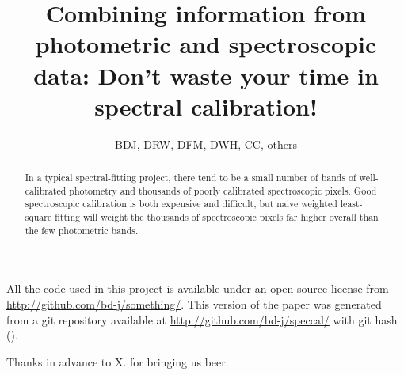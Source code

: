 \documentclass[12pt, preprint]{aastex}
\begin{document}
\title{Combining information from photometric and spectroscopic data:
  Don't waste your time in spectral calibration!}
\author{BDJ, DRW, DFM, DWH, CC, others}

\begin{abstract}
In a typical spectral-fitting project,
  there tend to be a small number of bands of well-calibrated photometry
  and thousands of poorly calibrated spectroscopic pixels.
Good spectroscopic calibration is both expensive and difficult,
  but naive weighted least-square fitting will weight
  the thousands of spectroscopic pixels far higher overall
  than the few photometric bands.
\end{abstract}


All the code used in this project is available under an open-source license
  from \url{http://github.com/bd-j/something/}.
This version of the paper was generated
  from a git repository available at \url{http://github.com/bd-j/speccal/}
  with git hash \texttt{\githash} (\gitdate).

\acknowledgements
Thanks in advance to X. for bringing us beer.
\end{document}
